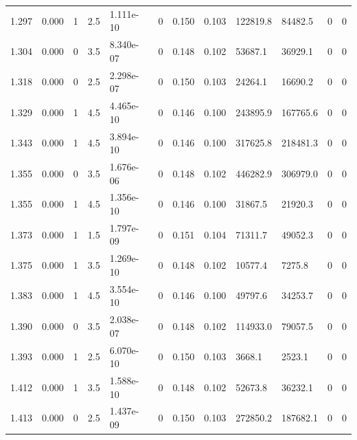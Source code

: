 \documentclass[preview]{standalone}
\begin{document}
{{{\begin{tabular}{L{1.2cm}C{1.2cm} C{0.3cm}C{0.5cm} C{1.4cm}C{1.4cm} C{1.4cm}C{1.4cm} C{1.6cm}C{1.6cm} C{1.6cm}C{1.6cm}}
  1.297  &  0.000  & 1     & 2.5 &  1.111e-10  & 0  &  0.150&   0.103& 122819.8 & 84482.5   &  0 & 0  \\ 
  1.304  &  0.000  & 0     & 3.5 &  8.340e-07  & 0  &  0.148&   0.102& 53687.1 & 36929.1   &  0 & 0  \\ 
  1.318  &  0.000  & 0     & 2.5 &  2.298e-07  & 0  &  0.150&   0.103& 24264.1 & 16690.2   &  0 & 0  \\ 
  1.329  &  0.000  & 1     & 4.5 &  4.465e-10  & 0  &  0.146&   0.100& 243895.9 & 167765.6   &  0 & 0  \\ 
  1.343  &  0.000  & 1     & 4.5 &  3.894e-10  & 0  &  0.146&   0.100& 317625.8 & 218481.3   &  0 & 0  \\ 
  1.355  &  0.000  & 0     & 3.5 &  1.676e-06  & 0  &  0.148&   0.102& 446282.9 & 306979.0   &  0 & 0  \\ 
  1.355  &  0.000  & 1     & 4.5 &  1.356e-10  & 0  &  0.146&   0.100& 31867.5 & 21920.3   &  0 & 0  \\ 
  1.373  &  0.000  & 1     & 1.5 &  1.797e-09  & 0  &  0.151&   0.104& 71311.7 & 49052.3   &  0 & 0  \\ 
  1.375  &  0.000  & 1     & 3.5 &  1.269e-10  & 0  &  0.148&   0.102& 10577.4 & 7275.8   &  0 & 0  \\ 
  1.383  &  0.000  & 1     & 4.5 &  3.554e-10  & 0  &  0.146&   0.100& 49797.6 & 34253.7   &  0 & 0  \\ 
  1.390  &  0.000  & 0     & 3.5 &  2.038e-07  & 0  &  0.148&   0.102& 114933.0 & 79057.5   &  0 & 0  \\ 
  1.393  &  0.000  & 1     & 2.5 &  6.070e-10  & 0  &  0.150&   0.103& 3668.1 & 2523.1   &  0 & 0  \\ 
  1.412  &  0.000  & 1     & 3.5 &  1.588e-10  & 0  &  0.148&   0.102& 52673.8 & 36232.1   &  0 & 0  \\ 
  1.413  &  0.000  & 0     & 2.5 &  1.437e-09  & 0  &  0.150&   0.103& 272850.2 & 187682.1   &  0 & 0  \\ 
\hline 
\end{tabular} 

}}}
\end{document}
